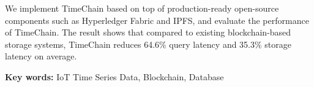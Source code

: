 We implement TimeChain based on top of production-ready open-source components such as Hyperledger Fabric and IPFS, and evaluate the performance of TimeChain. 
The result shows that compared to existing blockchain-based storage systems, TimeChain reduces 64.6\% query latency and 35.3\% storage latency on average.


{\noindent \textbf{Key words:} IoT Time Series Data, Blockchain, Database}
